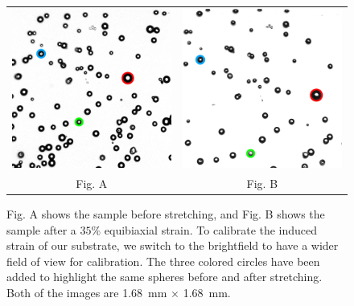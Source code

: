\begin{figure}[h!]
	\begin{tabular}{cc}
		\includegraphics[width= .48\linewidth,frame]{Chapters/Figures/181115_unstretched_b_thesis_contrast_RGB.pdf} & \includegraphics[width= .48\linewidth,frame]{Chapters/Figures/181115_stretched_thesis_contrast_RGB.pdf}\\
		Fig. A & Fig. B
	\end{tabular}
	\caption[Bright-field stretch calibration images]{Fig. A shows the sample before stretching, and Fig. B shows the sample after a $ 35\% $ equibiaxial strain. To calibrate the induced strain of our substrate, we switch to the brightfield to have a wider field of view for calibration. The three colored circles have been added to highlight the same spheres before and after stretching. Both of the images are 1.68~mm $ \times $ 1.68~mm.}
		\label{fig:TDpreandpost}
\end{figure}

